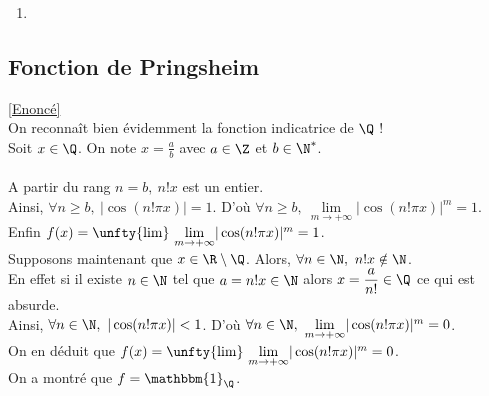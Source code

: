 \documentclass{book}
\begin{document}
\begin{enumerate}[leftmargin=*]
		Dans tous les cas $f(x^\alpha)=f(x)^\alpha$.\\
		Ainsi $\forall x>0,\ f(x)=f(e^{\ln x})=f(e)^{\ln x}=x^{\ln(f(e))}$.\\
		En particulier, $\exists \lambda\geq 0,\ \forall x\in \R,\ f(x)=x^\lambda$. Finalement, comme $f$ est définie sur $\R$, $\lambda$ est un entier naturel impair.\\
		On conclut que les fonctions monotones vérifiant $\forall (x,y)\in \R^2,\ f(xy)=f(x)f(y)$ sont, la fonction nulle et les fonctions $x\mapsto x^n$ avec $n$ un entier naturel nul ou impair.
		\item 
	\end{enumerate}
	
	\subsection{Fonction de Pringsheim }
	\label{Fonction de Pringsheim corrigé}
	\textcolor{blue}{\hyperref[Fonction de Pringsheim]{[Enoncé]}}\\
	On reconnaît bien évidemment la fonction indicatrice de $\Q$ !\\
	Soit $x\in \Q$. On note $x=\displaystyle\frac{a}{b}$ avec $a\in \Z$ et $b\in \N^*$.\\\\
	A partir du rang $n=b,\ n!x$ est un entier.\\
	Ainsi, $\forall n\geq b,\ |\cos(n!\pi x)|=1$. D'où $\forall n\geq b,\ \underset{m\to +\infty}{\lim}|\cos(n!\pi x)|^m=1$.\\
	Enfin $f(x)=\unfty{\lim}\ \underset{m\to +\infty}{\lim}|\cos(n!\pi x)|^m=1$.\\
	Supposons maintenant que $x\in \R\setminus\Q$. Alors, $\forall n\in \N,\ n!x\notin \N$.\\
	En effet si il existe $n\in \N$ tel que $a=n!x\in \N$ alors $x=\displaystyle\frac{a}{n!}\in \Q$ ce qui est absurde.\\
	Ainsi, $\forall n\in \N,\ |\cos(n!\pi x)|<1$. D'où $\forall n\in \N,\ \underset{m\to +\infty}{\lim}|\cos(n!\pi x)|^m=0$.\\
	On en déduit que $f(x)=\unfty{\lim}\ \underset{m\to +\infty}{\lim}|\cos(n!\pi x)|^m=0$.\\
	On a montré que $f=\mathbbm{1}_\Q$.
	
\end{document}
